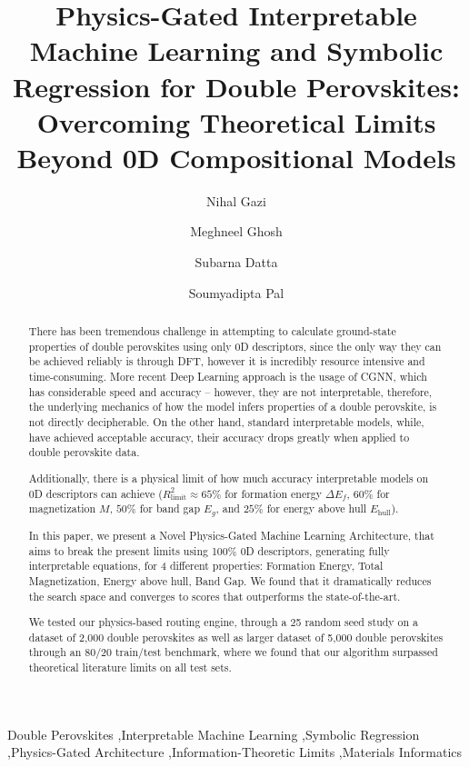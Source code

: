 \documentclass[12pt,onecolumn]{elsarticle}
\begin{document}
\begin{frontmatter}

\title{Physics-Gated Interpretable Machine Learning and Symbolic Regression for Double Perovskites: Overcoming Theoretical Limits Beyond 0D Compositional Models}

\author{Nihal Gazi}
\author{Meghneel Ghosh}
\author{Subarna Datta}
\author{Soumyadipta Pal}

\address{Institute of Engineering \& Management, Management House, D-1, Sector-V, Saltlake Electronics Complex, Kolkata-700091, India}
\address{University of Engineering and Management, New Town, University Area, Plot No. III, B/5, New Town Rd, Action Area III, Newtown, Kolkata-700160, India}

\begin{abstract}
There has been tremendous challenge in attempting to calculate ground-state properties of double perovskites using only 0D descriptors, since the only way they can be achieved reliably is through DFT, however it is incredibly resource intensive and time-consuming. More recent Deep Learning approach is the usage of CGNN, which has considerable speed and accuracy -- however, they are not interpretable, therefore, the underlying mechanics of how the model infers properties of a double perovskite, is not directly decipherable. On the other hand, standard interpretable models, while, have achieved acceptable accuracy, their accuracy drops greatly when applied to double perovskite data.

Additionally, there is a physical limit of how much accuracy interpretable models on 0D descriptors can achieve ($R^2_{\text{limit}} \approx 65\%$ for formation energy $\Delta E_f$, $60\%$ for magnetization $M$, $50\%$ for band gap $E_g$, and $25\%$ for energy above hull $E_{\text{hull}}$).

In this paper, we present a Novel Physics-Gated Machine Learning Architecture, that aims to break the present limits using 100\% 0D descriptors, generating fully interpretable equations, for 4 different properties: Formation Energy, Total Magnetization, Energy above hull, Band Gap. We found that it dramatically reduces the search space and converges to scores that outperforms the state-of-the-art.

We tested our physics-based routing engine, through a 25 random seed study on a dataset of 2,000 double perovskites as well as larger dataset of 5,000 double perovskites through an 80/20 train/test benchmark, where we found that our algorithm surpassed theoretical literature limits on all test sets.
\end{abstract}


\begin{keyword}
Double Perovskites \sep Interpretable Machine Learning \sep Symbolic Regression \sep Physics-Gated Architecture \sep Information-Theoretic Limits \sep Materials Informatics
\end{keyword}

\end{frontmatter}
\end{document}
